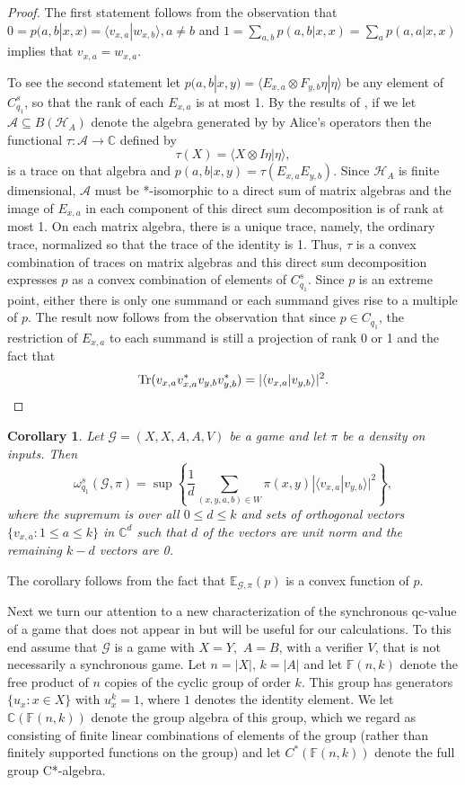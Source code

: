 \documentclass[11pt]{amsart}
\newtheorem{cor}[thm]{Corollary}
\theoremstyle{definition}
\DeclareMathOperator{\Tr}{Tr}
\newcommand{\bb}[1]{\mathbb{#1}}
\newcommand{\cl}[1]{\mathcal{#1}}
\begin{document}
 \begin{proof} The first statement follows from the observation that $0=p(a,b|x,x) = \langle v_{x,a} | w_{x,b} \rangle, a \ne b$ and $1= \sum_{a,b} p(a,b|x,x) = \sum_a p(a,a|x,x)$ implies that $v_{x,a} = w_{x,a}$.

 To see the second statement let $p(a,b|x,y)= \langle E_{x,a} \otimes F_{y,b} \eta | \eta \rangle$ be any element of $C^s_{q_1}$, so that the rank of each $E_{x,a}$ is at most 1. By the results of \cite{PSSTW}, if we let $\cl A \subseteq B(\cl H_A)$ denote the algebra generated by by Alice's operators then the functional $\tau: \cl A \to \bb C$ defined by
 \[ \tau(X) = \langle X \otimes I \eta | \eta \rangle,\]
 is a trace on that algebra and $p(a,b|x,y) = \tau(E_{x,a}E_{y,b})$.  Since $\cl H_A$ is finite dimensional, $\cl A$ must be *-isomorphic to a direct sum of matrix algebras and the image of $E_{x,a}$ in each component of this direct sum decomposition is of rank at most 1. On each matrix algebra, there is a unique trace, namely, the ordinary trace, normalized so that the trace of the identity is 1. Thus, $\tau$ is a convex combination of traces on matrix algebras and this direct sum decomposition expresses $p$ as a convex combination of elements of $C^s_{q_1}$. Since $p$ is an extreme point, either there is only one summand or each summand gives rise to a multiple of $p$.
 The result now follows from the observation that since $p \in C_{q_1}$, the restriction of $E_{x,a}$ to each summand is still a projection of rank 0 or 1 and the fact that
 \[\Tr(v_{x,a}v_{x,a}^* v_{y,b} v_{y,b}^*) = |\langle v_{x,a} | v_{y,b} \rangle |^2.\qedhere\]
 \end{proof}

 \begin{cor}\label{cor:q1} Let $\cl G=(X, X, A, A, V)$ be a game and let $\pi$ be a density on inputs.  Then
 \[ \omega^s_{q_1}(\cl G, \pi) = \sup \left\{\frac{1}{d} \sum_{(x,y,a,b) \in W} \pi(x,y)| \langle v_{x,a} | v_{y,b} \rangle |^2\right\},\]
where the supremum is over all $0\le d \le k$ and sets of orthogonal vectors $\{ v_{x,a} : 1 \le a \le k \}$ in $\bb C^d$ such that $d$ of the vectors are unit norm and the remaining $k-d$ vectors are 0.
\end{cor}

The corollary follows from the fact that $\bb E_{\cl G, \pi}(p)$ is a convex function of $p$.

Next we turn our attention to a new characterization of the synchronous qc-value of a game that does not appear in \cite{HMNPR} but will be useful for our calculations.   To this end assume that $\cl G$ is a game with $X=Y,\,\, A = B$, with a verifier $V$, that is not necessarily a synchronous game. Let $n=|X|, \, k = |A|$ and let $\bb F(n,k)$ denote the free product of $n$ copies of the cyclic group of order $k$. This group has generators $\{ u_x: x \in X \}$ with $u_x^k = 1$, where $1$ denotes the identity element.  We let $\bb C(\bb F(n,k))$ denote the group algebra of this group, which we regard as consisting of finite linear combinations of elements of the group (rather than finitely supported functions on the group) and let $C^*(\bb F(n,k))$ denote the full group C*-algebra.
\end{document}
